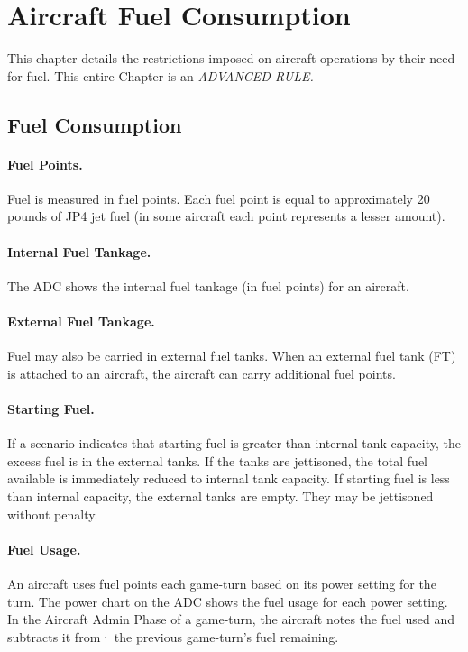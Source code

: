 \section{Aircraft Fuel Consumption}

This chapter details the restrictions imposed on aircraft operations by their need for fuel. This entire Chapter is an \emph{ADVANCED RULE.}

\subsection{Fuel Consumption}

\paragraph{Fuel Points.} Fuel is measured in fuel points. Each fuel point is equal to approximately 20 pounds of JP4 jet fuel (in some aircraft each point represents a lesser amount).

\paragraph{Internal Fuel Tankage.} The ADC shows the internal fuel tankage (in fuel points) for an aircraft.

\paragraph{External Fuel Tankage.} Fuel may also be carried in external fuel tanks. When an external fuel tank (FT) is attached to an aircraft, the aircraft can carry additional fuel points.

\paragraph{Starting Fuel.} If a scenario indicates that starting fuel is greater than internal tank capacity, the excess fuel is in the external tanks. If the tanks are jettisoned, the total fuel available is immediately reduced to internal tank capacity. If starting fuel is less than internal capacity, the external tanks are empty. They may be jettisoned without penalty.

\paragraph{Fuel Usage.} An aircraft uses fuel points each game-turn based on its power setting for the turn. The power chart on the ADC shows the fuel usage for each power setting. In the Aircraft Admin Phase of a game-turn, the aircraft notes the fuel used and subtracts it from· the previous game-turn's fuel remaining.

